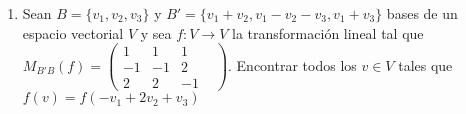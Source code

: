 \documentclass[../practica.root.tex]{subfiles}
\begin{document}
\begin{enumerate}
    \item Sean $B = \{v_1, v_2, v_3\}$ y $B' = \{v_1 + v_2, v_1 - v_2 - v_3, v_1 + v_3\}$ bases de un espacio vectorial $V$ y sea $f:V \to V$ la transformación lineal tal que $M_{B'B}(f) = \begin{pmatrix}
              1 & 1 & 1 & \\ -1 & -1 & 2 \\ 2 & 2 & -1
          \end{pmatrix}$. Encontrar todos los $v \in V$ tales que $f(v) = f(-v_1 + 2v_2 + v_3)$

\end{enumerate}
\end{document}
